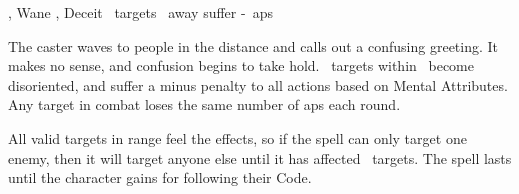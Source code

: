   {\mWater, \mFate}%
  {Wane}%
  {\distant, \duplicated}%
  {Deceit}%
  {\spellArea\ targets \spellRange\ away suffer -~\glspl{ap}}%
  {
    The caster waves to people in the distance and calls out a confusing greeting.
    It makes no sense, and confusion begins to take hold.
    \spellArea\ targets within \spellRange\ become disoriented, and suffer a minus  penalty to all actions based on Mental Attributes.
    Any target in combat loses the same number of \glspl{ap} each round.

    All valid targets in range feel the effects, so if the spell can only target one enemy, then it will target anyone else until it has affected \spellArea\ targets.
    The spell lasts until the character gains  for following their Code.
  }
